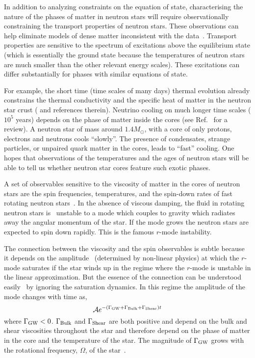 \documentclass[10pt, aps, prd, superscriptaddress, nofootinbib, 
               amsmath, amssymb, twocolumn,
               preprintnumbers, showpacs,
               raggedbottom,
               floatfix]{revtex4-1}
\begin{document}
In addition to analyzing constraints on the equation of state, characterising
the nature of the phases of matter in neutron stars will require
observationally constraining the transport properties of neutron stars. These
observations can help eliminate models of dense matter inconsistent with the
data~\cite{page2006dense}. Transport properties are
sensitive to the spectrum of excitations above the equilibrium state (which is
essentially the ground state because the temperatures of neutron stars are much
smaller than the other relevant energy scales). These excitations can
differ substantially for phases with similar equations of state.

For example, the short time (time scales of many days) thermal evolution
already constrains the thermal conductivity and the specific heat of matter in
the neutron star crust (\cite{Chamel:2008ca,Page:2012zt} and references
therein). Neutrino cooling on much longer time scales ($10^5$ years) depends on
the phase of matter inside the cores (see
Ref.~\cite{Pethick:1992,Yakovlev:2000jp,Yakovlev:2003} for a review). A neutron
star of mass around $1.4M_\odot$, with a core of only protons, electrons and
neutrons cools ``slowly''. The presence of condensates, strange particles, or
unpaired quark matter in the cores, leads to ``fast'' cooling.  One hopes that
observations of the temperatures and the ages of neutron stars will be able to
tell us whether neutron star cores feature such exotic phases.

A set of observables sensitive to the viscosity of matter in the cores of neutron
stars are the spin frequencies, temperatures, and the
spin-down rates of fast rotating neutron stars~\cite{Alford:2013pma}. In the
absence of viscous damping, the fluid in rotating neutron stars
is~\cite{Andersson:1997xt,Andersson:1997rn} unstable to a mode which
couples to gravity which radiates away the angular momentum of the
star. If the mode grows the neutron stars are expected to spin down rapidly.
This is the famous $r$-mode instability.

The connection between the viscosity and the spin observables is subtle because
it depends on the amplitude~\cite{Lindblom:2000az,Alford:2011pi} (determined by
non-linear physics) at which the $r$-mode saturates if the star winds up in the
regime where the $r$-mode is unstable in the linear approximation.  But the
essence of the connection can be understood
easily~\cite{Andersson:1997xt,Andersson:1997rn,Alford:2010fd} by ignoring the
saturation dynamics.  In this regime the amplitude of the mode changes with
time as,
\begin{equation}
{\cal{A}}e^{-(\Gamma_{\rm{GW}}+\Gamma_{\rm{Bulk}}+\Gamma_{\rm{Shear}})t}
\end{equation}
where $\Gamma_{\rm{GW}}<0$. $\Gamma_{\rm{Bulk}}$ and $\Gamma_{\rm{Shear}}$ are
both positive and depend on the bulk and shear viscosities throughout the star
and therefore depend on the phase of matter in the core and the temperature of
the star. The magnitude of $\Gamma_{\rm{GW}}$ grows with the rotational
frequency, $\Omega$, of the star~\cite{Andersson:1997xt}.
\end{document}
